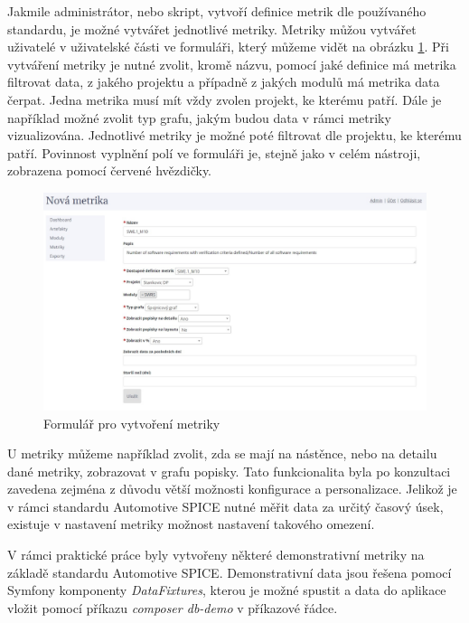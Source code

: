 \documentclass[czech,master,public,dept460,male,cpdeclaration,oneside]{diploma}
\begin{document}
Jakmile administrátor, nebo skript, vytvoří definice metrik dle používaného standardu, je možné vytvářet jednotlivé metriky. Metriky můžou vytvářet uživatelé v uživatelské části ve formuláři, který můžeme vidět na obrázku \ref{fig:new_metric_from}. Při vytváření metriky je nutné zvolit, kromě názvu, pomocí jaké definice má metrika filtrovat data, z jakého projektu a případně z jakých modulů má metrika data čerpat. Jedna metrika musí mít vždy zvolen projekt, ke kterému patří. Dále je například možné zvolit typ grafu, jakým budou data v rámci metriky vizualizována. Jednotlivé metriky je možné poté filtrovat dle projektu, ke kterému patří. Povinnost vyplnění polí ve formuláři je, stejně jako v celém nástroji, zobrazena pomocí červené hvězdičky.


\begin{figure}[!ht]
    \centering
    \includegraphics[width=1\textwidth]{Diplomka/Figures/new_metric_form.jpg}
    \caption{Formulář pro vytvoření metriky}
    \label{fig:new_metric_from}
\end{figure}

U metriky můžeme například zvolit, zda se mají na nástěnce, nebo na detailu dané metriky, zobrazovat v grafu popisky. Tato funkcionalita byla po konzultaci zavedena zejména z důvodu větší možnosti konfigurace a personalizace. Jelikož je v rámci standardu Automotive SPICE nutné měřit data za určitý časový úsek, existuje v nastavení metriky možnost nastavení takového omezení.

V rámci praktické práce byly vytvořeny některé demonstrativní metriky na základě standardu Automotive SPICE. \cite{ref:metrics_and_dashboard_for_level_two} Demonstrativní data jsou řešena pomocí Symfony komponenty \textit{DataFixtures}, kterou je možné spustit a data do aplikace vložit pomocí příkazu \textit{composer db-demo} v příkazové řádce. 
\end{document}
